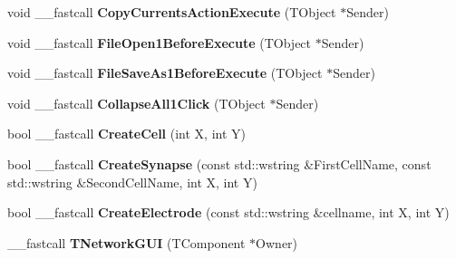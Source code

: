 \begin{DoxyCompactItemize}
\item 
\hypertarget{class_t_network_g_u_i_a64bc89cbffd96bd666494d36f8acf5b3}{void \+\_\+\+\_\+fastcall {\bfseries Copy\+Currents\+Action\+Execute} (T\+Object $\ast$Sender)}\label{class_t_network_g_u_i_a64bc89cbffd96bd666494d36f8acf5b3}

\item 
\hypertarget{class_t_network_g_u_i_a77217e3afbff8671e5669ad398329c30}{void \+\_\+\+\_\+fastcall {\bfseries File\+Open1\+Before\+Execute} (T\+Object $\ast$Sender)}\label{class_t_network_g_u_i_a77217e3afbff8671e5669ad398329c30}

\item 
\hypertarget{class_t_network_g_u_i_ade63c4e3eb3bdfdd0ed19ea62d889d62}{void \+\_\+\+\_\+fastcall {\bfseries File\+Save\+As1\+Before\+Execute} (T\+Object $\ast$Sender)}\label{class_t_network_g_u_i_ade63c4e3eb3bdfdd0ed19ea62d889d62}

\item 
\hypertarget{class_t_network_g_u_i_acbd47117ccdcf4c7ae80a71f28edc014}{void \+\_\+\+\_\+fastcall {\bfseries Collapse\+All1\+Click} (T\+Object $\ast$Sender)}\label{class_t_network_g_u_i_acbd47117ccdcf4c7ae80a71f28edc014}

\item 
\hypertarget{class_t_network_g_u_i_ad6c6cea6386a3fad7d82b565a155cb62}{bool \+\_\+\+\_\+fastcall {\bfseries Create\+Cell} (int X, int Y)}\label{class_t_network_g_u_i_ad6c6cea6386a3fad7d82b565a155cb62}

\item 
\hypertarget{class_t_network_g_u_i_abdbeac682dd72398d5595526288beb90}{bool \+\_\+\+\_\+fastcall {\bfseries Create\+Synapse} (const std\+::wstring \&First\+Cell\+Name, const std\+::wstring \&Second\+Cell\+Name, int X, int Y)}\label{class_t_network_g_u_i_abdbeac682dd72398d5595526288beb90}

\item 
\hypertarget{class_t_network_g_u_i_ad7e300956e9f1475d9ca86185fd5b31c}{bool \+\_\+\+\_\+fastcall {\bfseries Create\+Electrode} (const std\+::wstring \&cellname, int X, int Y)}\label{class_t_network_g_u_i_ad7e300956e9f1475d9ca86185fd5b31c}

\item 
\hypertarget{class_t_network_g_u_i_a80f01942447154bb5a241b3d295bfe82}{\+\_\+\+\_\+fastcall {\bfseries T\+Network\+G\+U\+I} (T\+Component $\ast$Owner)}\label{class_t_network_g_u_i_a80f01942447154bb5a241b3d295bfe82}

\end{DoxyCompactItemize}
